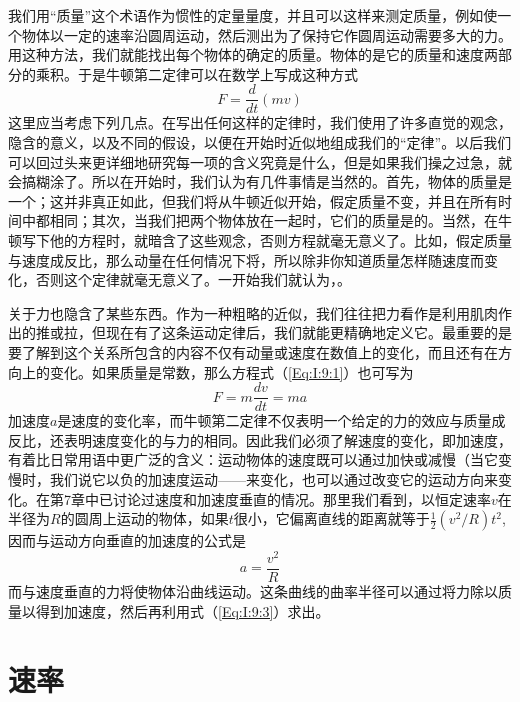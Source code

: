 我们用“质量”这个术语作为惯性的定量量度，并且可以这样来测定质量，例如使一个物体以一定的速率沿圆周运动，然后测出为了保持它作圆周运动需要多大的力。用这种方法，我们就能找出每个物体的确定的质量。物体的是它的质量和速度两部分的乘积。于是牛顿第二定律可以在数学上写成这种方式
\begin{equation}
    \label{Eq:I:9:1}
    F=\frac{d}{dt}(mv)
\end{equation}
这里应当考虑下列几点。在写出任何这样的定律时，我们使用了许多直觉的观念，隐含的意义，以及不同的假设，以便在开始时近似地组成我们的“定律”。以后我们可以回过头来更详细地研究每一项的含义究竟是什么，但是如果我们操之过急，就会搞糊涂了。所以在开始时，我们认为有几件事情是当然的。首先，物体的质量是一个；这并非真正如此，但我们将从牛顿近似开始，假定质量不变，并且在所有时间中都相同；其次，当我们把两个物体放在一起时，它们的质量是的。当然，在牛顿写下他的方程时，就暗含了这些观念，否则方程就毫无意义了。比如，假定质量与速度成反比，那么动量在任何情况下将，所以除非你知道质量怎样随速度而变化，否则这个定律就毫无意义了。一开始我们就认为，。

关于力也隐含了某些东西。作为一种粗略的近似，我们往往把力看作是利用肌肉作出的推或拉，但现在有了这条运动定律后，我们就能更精确地定义它。最重要的是要了解到这个关系所包含的内容不仅有动量或速度在数值上的变化，而且还有在方向上的变化。如果质量是常数，那么方程式（\ref{Eq:I:9:1}）也可写为
\begin{equation}
    \label{Eq:I:9:2}
    F=m\frac{dv}{dt}=ma
\end{equation}
加速度$a$是速度的变化率，而牛顿第二定律不仅表明一个给定的力的效应与质量成反比，还表明速度变化的与力的相同。因此我们必须了解速度的变化，即加速度，有着比日常用语中更广泛的含义：运动物体的速度既可以通过加快或减慢（当它变慢时，我们说它以负的加速度运动——来变化，也可以通过改变它的运动方向来变化。在第7章中已讨论过速度和加速度垂直的情况。那里我们看到，以恒定速率$v$在半径为$R$的圆周上运动的物体，如果$t$很小，它偏离直线的距离就等于$\frac{1}{2}(v^2/R)t^2$,因而与运动方向垂直的加速度的公式是
\begin{equation}
    \label{Eq:I:9:3}
    a=\frac{v^2}{R}
\end{equation}
而与速度垂直的力将使物体沿曲线运动。这条曲线的曲率半径可以通过将力除以质量以得到加速度，然后再利用式（\ref{Eq:I:9:3}）求出。

\section{速率}


